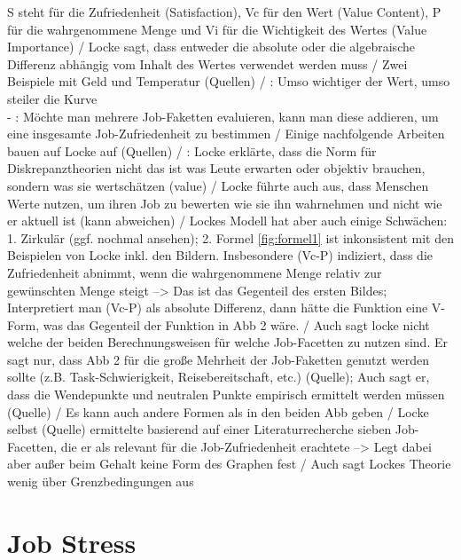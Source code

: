 S steht für die Zufriedenheit (Satisfaction),  Vc für den Wert (Value Content), P für die wahrgenommene Menge und Vi für die Wichtigkeit des Wertes (Value Importance) / Locke sagt, dass entweder die absolute oder die algebraische Differenz abhängig vom Inhalt des Wertes verwendet werden muss / Zwei Beispiele mit Geld und Temperatur (Quellen) / \cite[S. 14]{edwards:2008}: Umso wichtiger der Wert, umso steiler die Kurve \\
- \cite[S. 14]{edwards:2008}: Möchte man mehrere Job-Faketten evaluieren, kann man diese addieren, um eine insgesamte Job-Zufriedenheit zu bestimmen / Einige nachfolgende Arbeiten bauen auf Locke auf (Quellen) / \cite[S. 15]{edwards:2008}: Locke erklärte, dass die Norm für Diskrepanztheorien nicht das ist was Leute erwarten oder objektiv brauchen, sondern was sie wertschätzen (value) / Locke führte auch aus, dass Menschen Werte nutzen, um ihren Job zu bewerten wie sie ihn wahrnehmen und nicht wie er aktuell ist (kann abweichen) / Lockes Modell hat aber auch einige Schwächen: 1. Zirkulär (ggf. nochmal ansehen); 2. Formel \ref{fig:formel1} ist inkonsistent mit den Beispielen von Locke inkl. den Bildern. Insbesondere (Vc-P) indiziert, dass die Zufriedenheit abnimmt, wenn die wahrgenommene Menge relativ zur gewünschten Menge steigt --> Das ist das Gegenteil des ersten Bildes; Interpretiert man (Vc-P) als absolute Differenz, dann hätte die Funktion eine V-Form, was das Gegenteil der Funktion in Abb 2 wäre. / Auch sagt locke nicht welche der beiden Berechnungsweisen für welche Job-Facetten zu nutzen sind. Er sagt nur, dass Abb 2 für die große Mehrheit der Job-Faketten genutzt werden sollte (z.B. Task-Schwierigkeit, Reisebereitschaft, etc.) (Quelle); Auch sagt er, dass die Wendepunkte und neutralen Punkte empirisch ermittelt werden müssen (Quelle) / Es kann auch andere Formen als in den beiden Abb geben / Locke selbst (Quelle) ermittelte basierend auf einer Literaturrecherche sieben Job-Facetten, die er als relevant für die Job-Zufriedenheit erachtete --> Legt dabei aber außer beim Gehalt keine Form des Graphen fest / Auch sagt Lockes Theorie wenig über Grenzbedingungen aus

\section{Job Stress}
\label{ch:notizen:jobStress}

